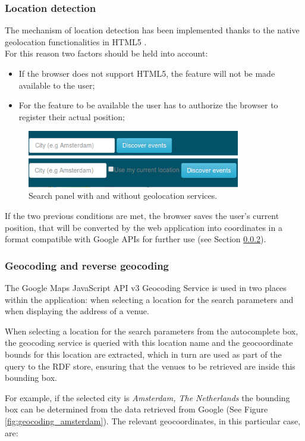 \documentclass[hidelinks,a4paper]{article}
\begin{document}
\subsubsection{Location detection}
The mechanism of location detection has been implemented thanks to the native geolocation functionalities in HTML5 \cite{geolocation} .\\
For this reason two factors should be held into account: 
\begin{itemize}
\item If the browser does not support HTML5, the feature will not be made available to the user;
\item For the feature to be available the user has to authorize the browser to register their actual position;
\end{itemize}
\begin{figure}[h!]
  \centering
    \includegraphics[height=2.5cm]{images/nogeolocation.png}    
    \caption{Search panel with and without geolocation services.}
\end{figure}
If the two previous conditions are met, the browser saves the user's current position, that will be converted by the web application into coordinates in a format compatible with Google APIs for further use (see Section \ref{geocoding}).
\subsubsection{Geocoding and reverse geocoding} \label{geocoding}
The Google Maps JavaScript API v3 Geocoding Service \cite{google_geocoding} is used in two places within the application: when selecting a location for the search parameters and when displaying the address of a venue.

When selecting a location for the search parameters from the autocomplete box, the geocoding service is queried with this location name and the geocoordinate bounds for this location are extracted, which in turn are used as part of the query to the RDF store, ensuring that the venues to be retrieved are inside this bounding box.

For example, if the selected city is \emph{Amsterdam, The Netherlands} the bounding box can be determined from the data retrieved from Google (See Figure \ref{fig:geocoding_amsterdam}). The relevant geocoordinates, in this particular case, are: 
\end{document}
